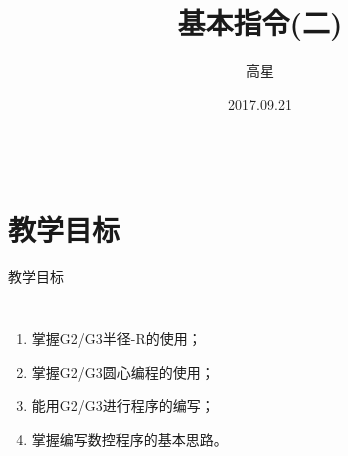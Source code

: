 \documentclass[UTF8,zihao=-4]{ctexbeamer}
\title{基本指令(二)}
\author{高星}
\institute{湖南潇湘技师学院~湖南九嶷职院}
\date{2017.09.21}
\begin{document}
    
\begin{frame}[plain]
		\maketitle
\end{frame}

\begin{frame}
\begin{columns}
\tableofcontents[hideallsubsections]
\end{columns}
\end{frame}

\section*{教学目标}

\begin{frame}{教学目标}
    \begin{columns}
        \begin{enumerate}
	\item 掌握G2/G3半径-R的使用；
\item 掌握G2/G3圆心编程的使用；
\item 能用G2/G3进行程序的编写；
\item 掌握编写数控程序的基本思路。
        \end{enumerate}
    \end{columns}
\end{frame}
\end{document}
